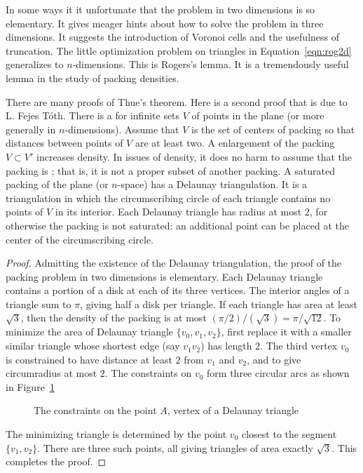 In some ways it it unfortunate that the problem in two dimensions is
so elementary.  It gives meager hints about how to solve the problem
in three dimensions.  It suggests the introduction of Voronoi cells
and the usefulness of truncation.  The little optimization problem on
triangles in Equation~\ref{eqn:rog2d} generalizes to $n$-dimensions.
This is Rogers's lemma.  It is a tremendously useful lemma in the
study of packing densities.


\bigskip

There are many proofs of Thue's theorem.  Here is a second proof that
is due to L. Fejes T\'oth.  There is a  for infinite sets $V$ of points in the plane (or more
generally in $n$-dimensions).  Assume that $V$ is the set of centers
of packing so that distances between points of $V$ are at least two.
A enlargement of the packing $V\subset V'$ increases density.  In
issues of density, it does no harm to assume that the packing is
; that is, it is not a proper subset of another
packing.  A saturated packing of the plane (or $n$-space) has a
Delaunay triangulation.  It is a triangulation in which the
circumscribing circle of each triangle contains no points of $V$ in
its interior.  Each Delaunay triangle has radius at most $2$, for
otherwise the packing is not saturated: an additional point can be
placed at the center of the circumscribing circle.

\begin{proof}
  Admitting the existence of the Delaunay triangulation, the proof of
  the packing problem in two dimensions is elementary.  Each Delaunay
  triangle contains a portion of a disk at each of its three vertices.
  The interior angles of a triangle sum to $\pi$, giving half a disk
  per triangle.  If each triangle has area at least $\sqrt{3}$, then
  the density of the packing is at most $(\pi/2)/(\sqrt{3}) =
  \pi/\sqrt{12}$.  To minimize the area of Delaunay triangle
  $\{v_0,v_1,v_2\}$, first replace it with a smaller similar triangle
  whose shortest edge (say $v_1v_2$) has length $2$.  The third vertex
  $v_0$ is constrained to have distance at least $2$ from $v_1$ and
  $v_2$, and to give circumradius at most $2$.  The constraints on
  $v_0$ form three circular arcs as shown in
  Figure~\ref{fig:2D-FT} %

\begin{figure}[htb]
  \centering
  \caption{The constraints on the point $A$, vertex of a Delaunay triangle}
  \label{fig:2D-FT}
\end{figure}

The minimizing triangle is determined by the point $v_0$ closest to
the segment $\{v_1,v_2\}$.  There are three such points, all giving
triangles of area exactly $\sqrt3$.  This completes the proof.
\end{proof}



\clearpage






